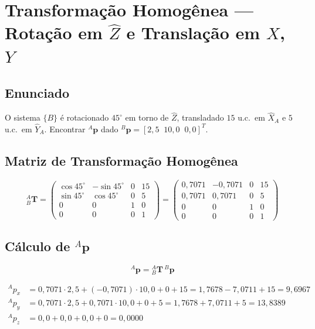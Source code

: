 \documentclass[12pt,a4paper]{article}
\newcommand{\Trans}[2]{{}^{#1}_{#2}\!\mathbf{T}}
\newcommand{\degr}{^{\circ}}
\begin{document}
\newpage

\section{Transformação Homogênea --- Rotação em $\hat{Z}$ e Translação em $X$, $Y$}

\subsection*{Enunciado}
O sistema $\{B\}$ é rotacionado $45\degr$ em torno de $\hat{Z}$, transladado $15$ u.c.\ em $\hat{X}_A$ e $5$ u.c.\ em $\hat{Y}_A$.
Encontrar ${}^{A}\mathbf{p}$ dado ${}^{B}\mathbf{p} = [2{,}5\;\;10{,}0\;\;0{,}0]^T$.

\subsection{Matriz de Transformação Homogênea}

\[
\Trans{A}{B} =
\begin{pmatrix}
  \cos 45\degr & -\sin 45\degr & 0 & 15 \\
  \sin 45\degr &  \cos 45\degr & 0 &  5 \\
  0            &  0            & 1 &  0 \\
  0            &  0            & 0 &  1
\end{pmatrix}
=
\begin{pmatrix}
  0{,}7071 & -0{,}7071 & 0 & 15 \\
  0{,}7071 &  0{,}7071 & 0 &  5 \\
  0        &  0        & 1 &  0 \\
  0        &  0        & 0 &  1
\end{pmatrix}
\]

\subsection{Cálculo de ${}^{A}\mathbf{p}$}

\[
{}^{A}\mathbf{p} = \Trans{A}{B}\,{}^{B}\mathbf{p}
\]

\begin{align*}
  {}^{A}p_x &= 0{,}7071 \cdot 2{,}5 + (-0{,}7071)\cdot 10{,}0 + 0 + 15
             = 1{,}7678 - 7{,}0711 + 15 = 9{,}6967 \\[4pt]
  {}^{A}p_y &= 0{,}7071 \cdot 2{,}5 + 0{,}7071 \cdot 10{,}0 + 0 + 5
             = 1{,}7678 + 7{,}0711 + 5 = 13{,}8389 \\[4pt]
  {}^{A}p_z &= 0{,}0 + 0{,}0 + 0{,}0 + 0 = 0{,}0000
\end{align*}
\end{document}
